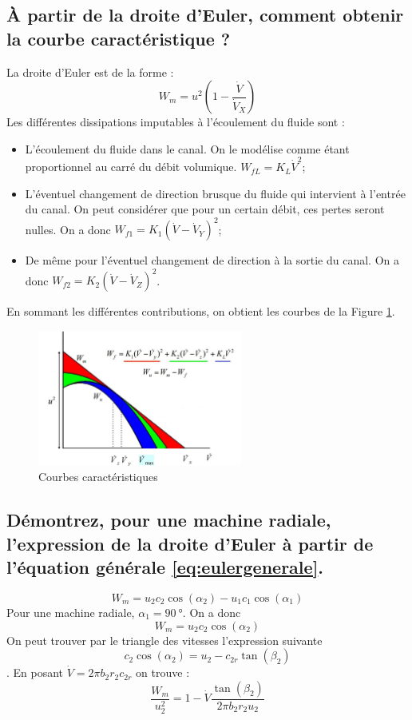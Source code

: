 \subsection{À partir de la droite d'Euler, comment obtenir la courbe caractéristique ? \label{ssec:droiteEuler}}
La droite d'Euler est de la forme :
\begin{equation} W_m = u^2\left(1-\frac{\dot{V}}{\dot{V}_X}\right) \end{equation}
Les différentes dissipations imputables à l'écoulement du fluide sont :
\begin{itemize}
	\item L'écoulement du fluide dans le canal. On le modélise comme étant proportionnel au carré du débit volumique. $W_{fL} = K_L\dot{V}^2$;
	\item L'éventuel changement de direction brusque du fluide qui intervient à l'entrée du canal. On peut considérer que pour un certain débit, ces pertes seront nulles. On a donc $W_{f1} = K_1(\dot{V}-\dot{V}_Y)^2$;
	\item De même pour l'éventuel changement de direction à la sortie du canal. On a donc $W_{f2} = K_2(\dot{V}-\dot{V}_Z)^2$.
\end{itemize}
En sommant les différentes contributions, on obtient les courbes de la Figure \ref{fig:droiteEuler}.
\begin{figure}[h]\centering
	\includegraphics[width=0.6\textwidth]{figures/courbescaracteristiques.png}
	\caption{Courbes caractéristiques}
	\label{fig:droiteEuler}
\end{figure}

\subsection{Démontrez, pour une machine radiale, l'expression de la droite d'Euler à partir de l'équation générale \ref{eq:eulergenerale}.}
\begin{equation} W_m = u_2c_2\cos(\alpha_2)-u_1c_1\cos(\alpha_1) \label{eq:eulergenerale} \end{equation}
Pour une machine radiale, $\alpha_1 = \SI{90}{\degree}$. On a donc 
\begin{equation} W_m = u_2c_2\cos(\alpha_2) \end{equation} 
On peut trouver par le triangle des vitesses l'expression suivante
\begin{equation} c_2\cos(\alpha_2) = u_2-c_{2r}\tan(\beta_2) \end{equation}.
En posant $\dot{V} = 2\pi b_2r_2c_{2r}$ on trouve :
\begin{equation} \frac{W_m}{u_2^2} = 1 - \dot{V}\frac{\tan(\beta_2)}{2\pi b_2r_2u_2} \end{equation}

